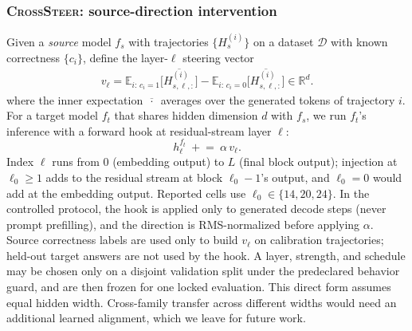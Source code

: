 \subsubsection{\textsc{CrossSteer}: source-direction intervention}
\label{sec:crosssteer-method}

Given a \emph{source} model $f_s$ with trajectories $\{H^{(i)}_{s}\}$ on a dataset
$\mathcal{D}$ with known correctness $\{c_i\}$, define the layer-$\ell$ steering vector
\begin{equation}
\label{eq:crosssteer}
\begin{aligned}
  v_\ell = \mathbb{E}_{i:\,c_i{=}1}\!\bigl[\overline{H^{(i)}_{s,\ell,:}}\bigr]
            - \mathbb{E}_{i:\,c_i{=}0}\!\bigl[\overline{H^{(i)}_{s,\ell,:}}\bigr]
            \in \mathbb{R}^d .
\end{aligned}
\end{equation}
where the inner expectation $\overline{\,\cdot\,}$ averages over the generated tokens
of trajectory $i$. For a target model $f_t$ that shares hidden dimension $d$ with
$f_s$, we run $f_t$'s inference with a forward hook at residual-stream layer $\ell$:
\begin{equation}
\label{eq:crosssteer-injection}
  h_\ell^{f_t}\ \mathrel{+}=\ \alpha\, v_\ell.
\end{equation}
Index $\ell$ runs from $0$ (embedding output) to $L$ (final block output);
injection at $\ell_0{\ge}1$ adds to the residual stream at block
$\ell_0{-}1$'s output, and $\ell_0{=}0$ would add at the embedding output.
Reported cells use $\ell_0\in\{14,20,24\}$.  In the controlled protocol,
the hook is applied only to generated decode steps (never prompt prefilling), and
the direction is RMS-normalized before applying $\alpha$.  Source correctness
labels are used only to build $v_\ell$ on calibration trajectories; held-out
target answers are not used by the hook.  A layer, strength, and schedule may be
chosen only on a disjoint validation split under the predeclared behavior guard,
and are then frozen for one locked evaluation.  This direct form assumes equal
hidden width. Cross-family transfer across different widths would need an
additional learned alignment, which we leave for future work.

